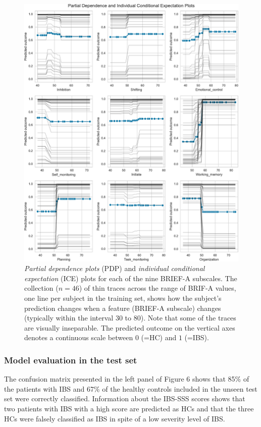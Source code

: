 \documentclass[jcm,article,submit,pdftex,moreauthors]{Definitions/mdpi}
\begin{document}
\begin{figure}[H]
\includegraphics[width=13.0cm]{Figs/BRIEF_all_items_PDP.pdf} 
\caption{\textit{Partial dependence plots} (PDP) and \textit{individual conditional expectation} (ICE) plots for each of the nine BRIEF-A subscales. The collection ($n=46$) of thin traces across the range of BRIF-A values, one line per subject in the training set, shows how the subject's prediction changes when a feature (BRIEF-A subscale) changes (typically within the interval $30$ to $80$). Note that some of the traces are visually inseparable. The predicted outcome on the vertical axes denotes a continuous scale between $0$ (=HC) and $1$ (=IBS).}
\end{figure} 


\subsubsection{Model evaluation in the test set}
The confusion matrix presented in the left panel of Figure 6 shows that 85\% of the patients with IBS and 67\% of the healthy controls included in the unseen test set were correctly classified. Information about the IBS-SSS scores shows that two patients with IBS with a high score are predicted as HCs and that the three HCs were falsely classified as IBS in spite of a low severity level of IBS. 
\end{document}
